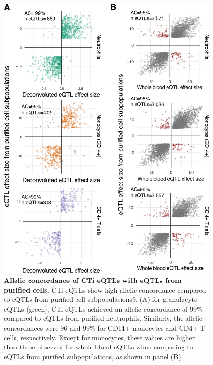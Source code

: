 \begin{figure}[H]
	\includegraphics[width=\textwidth]{chapters/chapter4-deconvolution/img/fig5.png}
	\caption{\textbf{Allelic concordance of CTi eQTLs with eQTLs from purified cells.} CTi eQTLs show high allelic concordance compared to eQTLs from purified cell subpopulations9. (A) for granulocyte eQTLs (green), CTi eQTLs achieved an allelic concordance of 99\% compared to eQTLs from purified neutrophils. Similarly, the allelic concordances were 96 and 99\% for CD14+ monocytes and CD4+ T cells, respectively. Except for monocytes, these values are higher than those observed for whole blood eQTLs when comparing to eQTLs from purified subpopulations, as shown in panel (B)}
	\label{decon_fig5}
\end{figure}

